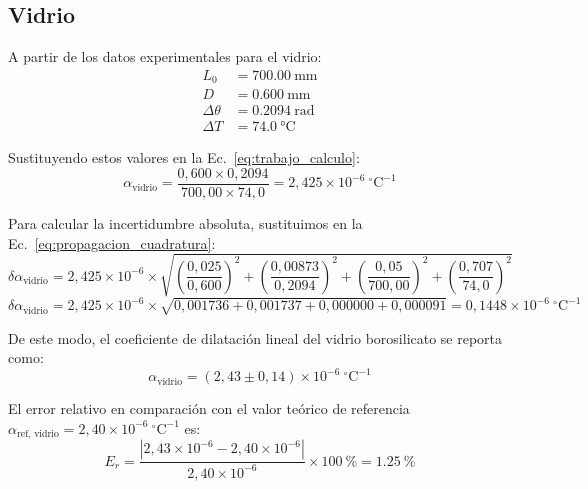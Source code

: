 \subsection{Vidrio}

A partir de los datos experimentales para el vidrio:
\begin{align*}
    L_0 &= \qty{700,00}{\milli\meter} \\
    D &= \qty{0,600}{\milli\meter} \\
    \Delta\theta &= \qty{0,2094}{\radian} \\
    \Delta T &= \qty{74,0}{\celsius}
\end{align*}

Sustituyendo estos valores en la Ec.~\eqref{eq:trabajo_calculo}:
\begin{equation*}
    \alpha_{\text{vidrio}} = \frac{0{,}600 \times 0{,}2094}{700{,}00 \times 74{,}0} = 2{,}425 \times 10^{-6}\ ^\circ\text{C}^{-1}
\end{equation*}

Para calcular la incertidumbre absoluta, sustituimos en la Ec.~\eqref{eq:propagacion_cuadratura}:
\begin{equation*}
    \delta\alpha_{\text{vidrio}} = 2{,}425 \times 10^{-6} \times \sqrt{
        \left(\frac{0{,}025}{0{,}600}\right)^2 +
        \left(\frac{0{,}00873}{0{,}2094}\right)^2 +
        \left(\frac{0{,}05}{700{,}00}\right)^2 +
        \left(\frac{0{,}707}{74{,}0}\right)^2
    }
\end{equation*}
\begin{equation*}
    \delta\alpha_{\text{vidrio}} = 2{,}425 \times 10^{-6} \times \sqrt{
        0{,}001736 + 0{,}001737 + 0{,}000000 + 0{,}000091
    } = 0{,}1448 \times 10^{-6}\ ^\circ\text{C}^{-1}
\end{equation*}

De este modo, el coeficiente de dilatación lineal del vidrio borosilicato se reporta como:
\begin{equation}
    \alpha_{\text{vidrio}} = (2{,}43 \pm 0{,}14) \times 10^{-6}\ ^\circ\text{C}^{-1}
    \label{eq:res_vidrio}
\end{equation}

El error relativo en comparación con el valor teórico de referencia $\alpha_{\text{ref, vidrio}} = 2{,}40 \times 10^{-6}\ ^\circ\text{C}^{-1}$ es:
\begin{equation*}
    E_r = \frac{|2{,}43 \times 10^{-6} - 2{,}40 \times 10^{-6}|}{2{,}40 \times 10^{-6}} \times \qty{100}{\percent} = \qty{1,25}{\percent}
\end{equation*}
